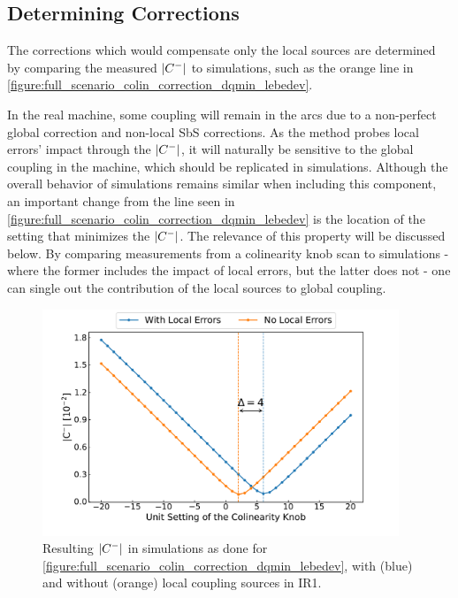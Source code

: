 \subsection{Determining Corrections}

The corrections which would compensate only the local sources are determined by comparing the measured \(\left\lvert C^{-} \right\rvert\) to simulations, such as the orange line in \cref{figure:full_scenario_colin_correction_dqmin_lebedev}.

In the real machine, some coupling will remain in the arcs due to a non-perfect global correction and non-local SbS corrections.
As the method probes local errors' impact through the \(\left\lvert C^{-} \right\rvert\), it will naturally be sensitive to the global coupling in the machine, which should be replicated in simulations.
Although the overall behavior of simulations remains similar when including this component, an important change from the line seen in \cref{figure:full_scenario_colin_correction_dqmin_lebedev} is the location of the setting that minimizes the \(\left\lvert C^{-} \right\rvert\).
The relevance of this property will be discussed below.
By comparing measurements from a colinearity knob scan to simulations - where the former includes the impact of local errors, but the latter does not - one can single out the contribution of the local sources to global coupling.

\begin{figure}[!htb]
    \centering
    \includegraphics*[width=0.95\textwidth]{Figures/IR_Coupling_Correction/full_scenario_determine_correction.pdf}
    \caption{Resulting \(\left\lvert C^{-} \right\rvert\) in simulations as done for \cref{figure:full_scenario_colin_correction_dqmin_lebedev}, with (\textcolor{mplblue}{blue}) and without (\textcolor{mplorange}{orange}) local coupling sources in IR\num{1}.}
    \label{figure:full_scenario_determine_correction}
\end{figure}

